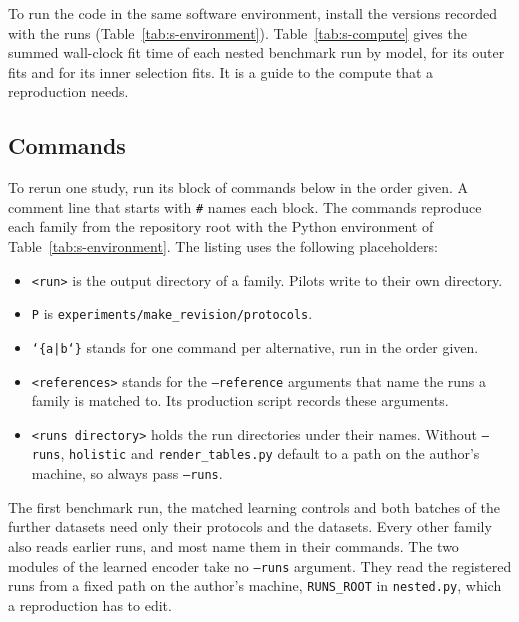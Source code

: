 To run the code in the same software environment, install the versions recorded with the runs (Table~\ref{tab:s-environment}). Table~\ref{tab:s-compute} gives the summed wall-clock fit time of each nested benchmark run by model, for its outer fits and for its inner selection fits. It is a guide to the compute that a reproduction needs.




\FloatBarrier
\subsection{Commands}\label{supp:commands}

{\raggedright To rerun one study, run its block of commands below in the order given. A comment line that starts with \texttt{\#} names each block. The commands reproduce each family from the repository root with the Python environment of Table~\ref{tab:s-environment}. The listing uses the following placeholders:
\begin{itemize}[leftmargin=2em,topsep=2pt,itemsep=1pt]
\item \texttt{<run>} is the output directory of a family. Pilots write to their own directory.
\item \texttt{P} is \texttt{experiments/make\_revision/protocols}.
\item \texttt{\char`\{a|b\char`\}} stands for one command per alternative, run in the order given.
\item \texttt{<references>} stands for the \texttt{--reference} arguments that name the runs a family is matched to. Its production script records these arguments.
\item \texttt{<runs directory>} holds the run directories under their names. Without \texttt{--runs}, \texttt{holistic} and \texttt{render\_tables.py} default to a path on the author's machine, so always pass \texttt{--runs}.
\end{itemize}\par}

The first benchmark run, the matched learning controls and both batches of the further datasets need only their protocols and the datasets. Every other family also reads earlier runs, and most name them in their commands. The two modules of the learned encoder take no \texttt{--runs} argument. They read the registered runs from a fixed path on the author's machine, \texttt{RUNS\_ROOT} in \texttt{nested.py}, which a reproduction has to edit.

